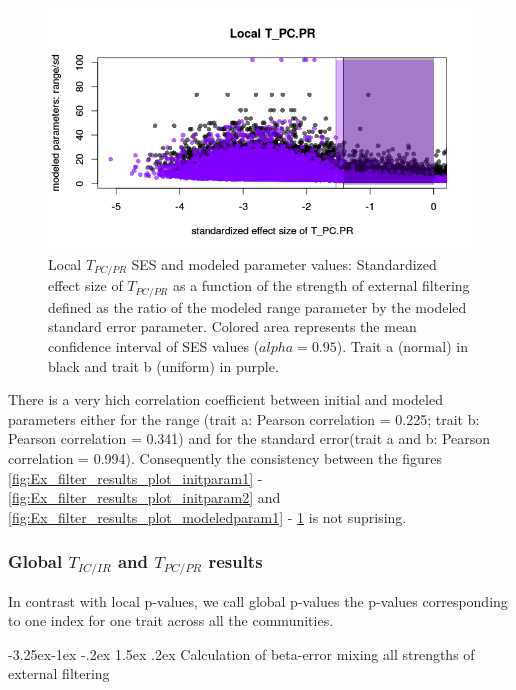\documentclass[12pt]{article}\usepackage[]{graphicx}\usepackage[]{color}
\makeatletter
\def\maxwidth{ %
  \ifdim\Gin@nat@width>\linewidth
    \linewidth
  \else
    \Gin@nat@width
  \fi
}
\newenvironment{knitrout}{}{} %
\newcounter {subsubsubsection}[subsubsection]
\newcommand\subsubsubsection{\@startsection{subsubsubsection}{4}{\z@}%
          {-3.25ex\@plus -1ex \@minus -.2ex}%
          {1.5ex \@plus .2ex}%
          {\normalfont\normalsize\bfseries}}
\makeatother
\begin{document}
\begin{knitrout}
\begin{figure}
{\centering \includegraphics[width=\maxwidth]{figure/Ex_filter_results_plot_modeledparam2-1} 

}

\caption[Local $T_{PC/PR}$ SES and modeled parameter values]{Local $T_{PC/PR}$ SES and modeled parameter values: Standardized effect size of $T_{PC/PR}$ as a function of the strength of external filtering defined as the ratio of the modeled range parameter by the modeled standard error parameter. Colored area represents the mean confidence interval of SES values ($alpha = 0.95$). Trait a (normal) in black and trait b (uniform) in purple.}\label{fig:Ex_filter_results_plot_modeledparam2}
\end{figure}


\end{knitrout}

There is a very hich correlation coefficient between initial and modeled parameters either for the range (trait a: Pearson correlation = 0.225; trait b: Pearson correlation = 0.341) and for the standard error(trait a and b: Pearson correlation = 0.994). Consequently the consistency between the figures \ref{fig:Ex_filter_results_plot_initparam1} - \ref{fig:Ex_filter_results_plot_initparam2} and \ref{fig:Ex_filter_results_plot_modeledparam1} - \ref{fig:Ex_filter_results_plot_modeledparam2} is not suprising. 
 
 \subsubsection {Global $T_{IC/IR}$ and $T_{PC/PR}$ results}
 
In contrast with local p-values, we call global p-values the p-values corresponding to one index for one trait across all the communities. 
 
  \subsubsubsection {Calculation of beta-error mixing all strengths of external filtering}
 
\end{document}
